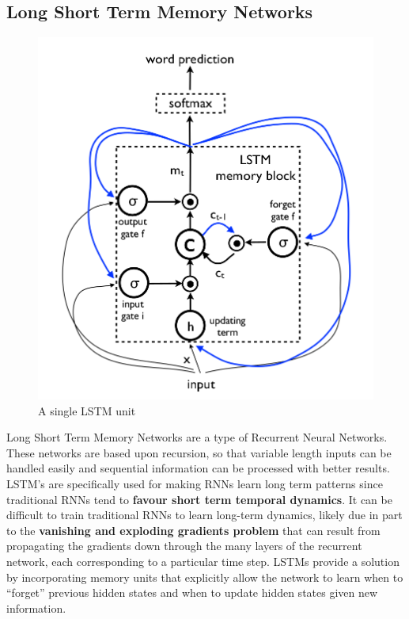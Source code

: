 \documentclass[11pt]{article}
\begin{document}
			\subsection{Long Short Term Memory Networks}
			    \begin{figure}[ht!]
			    	\centering
					\includegraphics[scale=0.266]{LSTM_unit.png}
					\caption{A single LSTM unit\label{fig6}}
				\end{figure}
				Long Short Term Memory Networks are a type of Recurrent Neural Networks. These networks are based upon recursion, so that variable length inputs can be handled easily and sequential information can be processed with better results. LSTM's are specifically used for making RNNs learn long term patterns since traditional RNNs tend to \textbf{favour short term temporal dynamics}. It can be difficult to train traditional RNNs to learn long-term dynamics, likely due in part to the \textbf{vanishing and exploding gradients problem} that can result from propagating the gradients down through the many layers of the recurrent network, each corresponding to a particular time step\cite{ltms}. LSTMs provide a solution by incorporating memory units that explicitly allow the network to learn when to ``forget'' previous hidden states and when to update hidden states given new information\cite{lstmexecute}.\\
\end{document}
